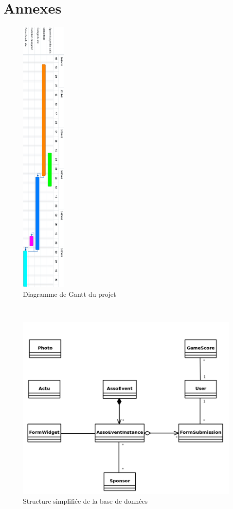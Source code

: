 \appendix
\renewcommand{\thefigure}{\Alph{figure}}

\chapter*{Annexes}

\begin{figure}[H]
    \centering
    \includegraphics[width=0.2\textwidth]{assets/pictures/gantt.png}
    \caption{Diagramme de Gantt du projet}
    \label{anx:gantt}
\end{figure}

\pagebreak

~

\begin{figure}[H]
    \centering
    \includegraphics[width=\textwidth]{assets/pictures/database.png}
    \caption{Structure simplifiée de la base de données}
    \label{anx:gantt}
\end{figure}


